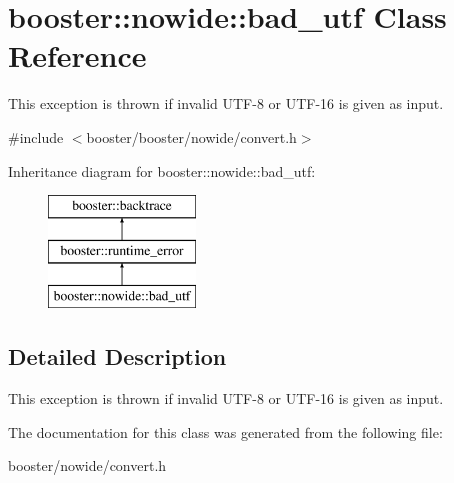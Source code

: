 \section{booster\-:\-:nowide\-:\-:bad\-\_\-utf \-Class \-Reference}
\label{classbooster_1_1nowide_1_1bad__utf}


\-This exception is thrown if invalid \-U\-T\-F-\/8 or \-U\-T\-F-\/16 is given as input.  




{\ttfamily \#include $<$booster/booster/nowide/convert.\-h$>$}

\-Inheritance diagram for booster\-:\-:nowide\-:\-:bad\-\_\-utf\-:\begin{figure}[H]
\begin{center}
\leavevmode
\includegraphics[height=3.000000cm]{classbooster_1_1nowide_1_1bad__utf}
\end{center}
\end{figure}


\subsection{\-Detailed \-Description}
\-This exception is thrown if invalid \-U\-T\-F-\/8 or \-U\-T\-F-\/16 is given as input. 

\-The documentation for this class was generated from the following file\-:\begin{DoxyCompactItemize}
\item 
booster/nowide/convert.\-h\end{DoxyCompactItemize}

